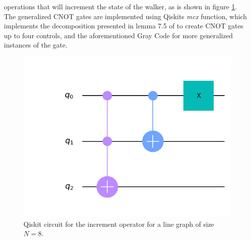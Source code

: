 \documentclass[../../dissertation.tex]{subfiles}
\begin{document}
operations that will increment the state of the walker, as is shown in figure
\ref{fig:incrCircuitQistkit}. The generalized CNOT gates are implemented using
Qiskits \textit{mcx} function, which implements the decomposition presented in
lemma 7.5 of \cite{barenco95} to create CNOT gates up to four controls, and the
aforementioned Gray Code for more generalized instances of the gate.
\begin{figure}[!h]
	\centering
	\includegraphics[scale=0.32]{img/Qiskit/CoinedQuantumWalk/Circuits/circIncr_N3_S3.png}
	\caption{Qiskit circuit for the increment operator for a line graph of size $N=8$.} 
	\label{fig:incrCircuitQistkit}
\end{figure}\par
\end{document}
